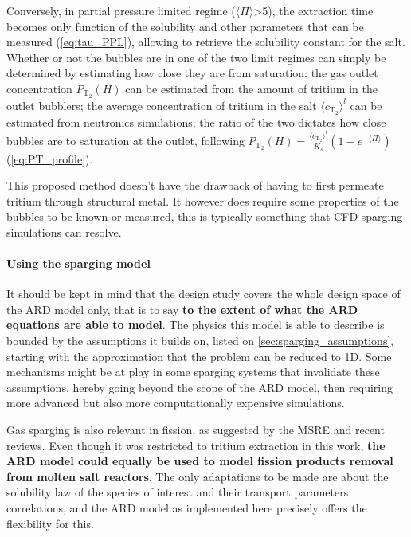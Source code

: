\documentclass[a4paper,11pt,oneside]{report}
\newcommand{\CT}{\ensuremath{c_\mathrm{T_2}}}
\newcommand{\PI}{\ensuremath{\langle \Pi \rangle}}
\newcounter{assumption}[chapter]
\begin{document}
Conversely, in partial pressure limited regime (\PI>5), the extraction time becomes only function of the solubility and other parameters that can be measured (\cref{eq:tau_PPL}), allowing to retrieve the solubility constant for the salt. Whether or not the bubbles are in one of the two limit regimes can simply be determined by estimating how close they are from saturation: the gas outlet concentration $P_\mathrm{T_2}(H)$ can be estimated from the amount of tritium in the outlet bubblers; the average concentration of tritium in the salt $\langle\CT\rangle^l$ can be estimated from neutronics simulations; the ratio of the two dictates how close bubbles are to saturation at the outlet, following $P_\mathrm{T_2}(H)=\frac{\langle\CT\rangle^l}{K_s}\left(1-e^{-\PI}\right)$ (\cref{eq:PT_profile}).

This proposed method doesn't have the drawback of having to first permeate tritium through structural metal. It however does require some properties of the bubbles to be known or measured, this is typically something that CFD sparging simulations can resolve.    

\paragraph{Using the sparging model}


It should be kept in mind that the design study covers the whole design space of the ARD model only, that is to say \textbf{to the extent of what the ARD equations are able to model}. The physics this model is able to describe is bounded by the assumptions it builds on, listed on \cref{sec:sparging_assumptions}, starting with the approximation that the problem can be reduced to 1D. Some mechanisms might be at play in some sparging systems that invalidate these assumptions, hereby going beyond the scope of the ARD model, then requiring more advanced but also more computationally expensive simulations. 

Gas sparging is also relevant in fission, as suggested by the MSRE and recent reviews\cite{evans_physics_2026}. Even though it was restricted to tritium extraction in this work, \textbf{the ARD model could equally be used to model fission products removal from molten salt reactors}. The only adaptations to be made are about the solubility law of the species of interest and their transport parameters correlations, and the ARD model as implemented here precisely offers the flexibility for this.    
\end{document}
